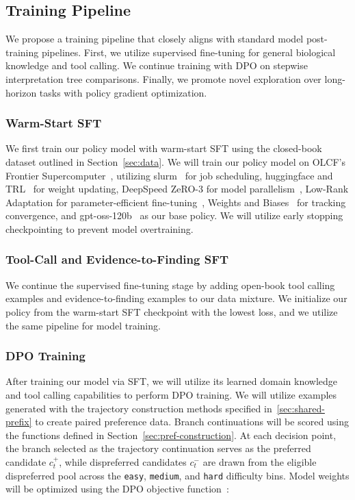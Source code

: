 \documentclass[thesis,letterpaper,12pt]{utthesis}
\begin{document}
\subsection{Training Pipeline}\label{sec:training}
We propose a training pipeline that closely aligns with standard model post-training pipelines. First, we utilize supervised fine-tuning for general biological knowledge and tool calling. We continue training with DPO on stepwise interpretation tree comparisons. Finally, we promote novel exploration over long-horizon tasks with policy gradient optimization.

\subsubsection{Warm-Start SFT}\label{sec:warmstart}
We first train our policy model with warm-start SFT using the closed-book dataset outlined in Section~\ref{sec:data}. We will train our policy model on OLCF's Frontier Supercomputer~\cite{frontier}, utilizing slurm~\cite{slurm} for job scheduling, huggingface and TRL~\cite{trl} for weight updating, DeepSpeed ZeRO-3 for model parallelism~\cite{deepspeed}, Low-Rank Adaptation for parameter-efficient fine-tuning~\cite{hu2022lora}, Weights and Biases~\cite{wandb} for tracking convergence, and gpt-oss-120b~\cite{gpt-oss} as our base policy. We will utilize early stopping checkpointing to prevent model overtraining.

\subsubsection{Tool-Call and Evidence-to-Finding SFT}
We continue the supervised fine-tuning stage by adding open-book tool calling examples and evidence-to-finding examples to our data mixture. We initialize our policy from the warm-start SFT checkpoint with the lowest loss, and we utilize the same pipeline for model training.

\subsubsection{DPO Training}
After training our model via SFT, we will utilize its learned domain knowledge and tool calling capabilities to perform DPO training. We will utilize examples generated with the trajectory construction methods specified in~\ref{sec:shared-prefix} to create paired preference data. Branch continuations will be scored using the functions defined in Section~\ref{sec:pref-construction}. At each decision point, the branch selected as the trajectory continuation serves as the preferred candidate $c_t^+$, while dispreferred candidates $c_t^-$ are drawn from the eligible dispreferred pool across the \texttt{easy}, \texttt{medium}, and \texttt{hard} difficulty bins. Model weights will be optimized using the DPO objective function~\cite{dpo}:
\end{document}
